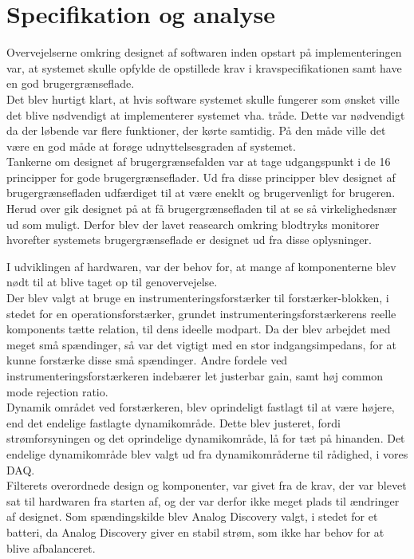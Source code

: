 \section{Specifikation og analyse}
Overvejelserne omkring designet af softwaren inden opstart på implementeringen var, at systemet skulle opfylde de opstillede krav i kravspecifikationen samt have en god brugergrænseflade.\\
Det blev hurtigt klart, at hvis software systemet skulle fungerer som ønsket ville det blive nødvendigt at implementerer systemet vha. tråde. Dette var nødvendigt da der løbende var flere funktioner, der kørte samtidig. På den måde ville det være en god måde at forøge udnyttelsesgraden af systemet.\\
Tankerne om designet af brugergrænsefalden var at tage udgangspunkt i de 16 principper for gode brugergrænseflader. Ud fra disse principper blev designet af brugergrænsefladen udfærdiget til at være eneklt og brugervenligt for brugeren. Herud over gik designet på at få brugergrænsefladen til at se så virkelighedsnær ud som muligt. Derfor blev der lavet reasearch omkring blodtryks monitorer hvorefter systemets brugergrænseflade er designet ud fra disse oplysninger. 
 
I udviklingen af hardwaren, var der behov for, at mange af komponenterne blev nødt til at blive taget op til genovervejelse. \\
Der blev valgt at bruge en instrumenteringsforstærker til forstærker-blokken, i stedet for en operationsforstærker, grundet instrumenteringsforstærkerens reelle komponents tætte relation, til dens ideelle modpart. Da der blev arbejdet med meget små spændinger, så var det vigtigt med en stor indgangsimpedans, for at kunne forstærke disse små spændinger. Andre fordele ved instrumenteringsforstærkeren indebærer let justerbar gain, samt høj common mode rejection ratio. \\
Dynamik området ved forstærkeren, blev oprindeligt fastlagt til at være højere, end det endelige fastlagte dynamikområde. Dette blev justeret, fordi strømforsyningen og det oprindelige dynamikområde, lå for tæt på hinanden. Det endelige dynamikområde blev valgt ud fra dynamikområderne til rådighed, i vores DAQ. \\
Filterets overordnede design og komponenter, var givet fra de krav, der var blevet sat til hardwaren fra starten af, og der var derfor ikke meget plads til ændringer af designet. Som spændingskilde blev Analog Discovery valgt, i stedet for et batteri, da Analog Discovery giver en stabil strøm, som ikke har behov for at blive afbalanceret. \\

